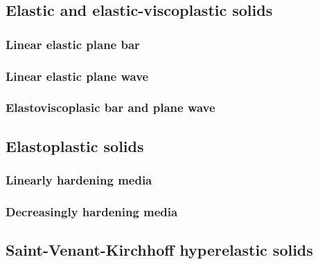 \subsection{Elastic and elastic-viscoplastic solids}
\subsubsection{Linear elastic plane bar}
\subsubsection{Linear elastic plane wave}
\subsubsection{Elastoviscoplasic bar and plane wave}
\subsection{Elastoplastic solids}
\subsubsection{Linearly hardening media}
\subsubsection{Decreasingly hardening media}
\subsection{Saint-Venant-Kirchhoff hyperelastic solids}

